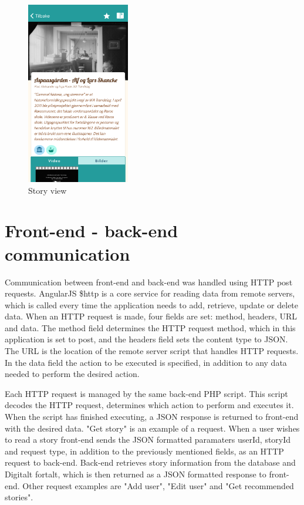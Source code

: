 \begin{figure}[h!]
	\ContinuedFloat
	\centering
	\includegraphics[width=0.4\textwidth]{fig/screenshot_story}
	\caption{Story view}
	\label{Fig:story_view}
\end{figure}

\section{Front-end - back-end communication}
\label{subsec:frontend-backend_communication}

Communication between front-end and back-end was handled using HTTP post requests.
AngularJS \$http is a core service for reading data from remote servers, which is called every time the application needs to add, retrieve, update or delete data. When an HTTP request is made, four fields are set: method, headers, URL and data. The method field determines the HTTP request method, which in this application is set to post, and the headers field sets the content type to JSON. The URL is the location of the remote server script that handles HTTP requests. In the data field the action to be executed is specified, in addition to any data needed to perform the desired action.\newline

Each HTTP request is managed by the same back-end PHP script. This script decodes the HTTP request, determines which action to perform and executes it. When the script has finished executing, a JSON response is returned to front-end with the desired data. "Get story" is an example of a request. When a user wishes to read a story front-end sends the JSON formatted paramaters userId, storyId and request type, in addition to the previously mentioned fields, as an HTTP request to back-end. Back-end retrieves story information from the database and Digitalt fortalt, which is then returned as a JSON formatted response to front-end. Other request examples are "Add user", "Edit user" and "Get recommended stories".

